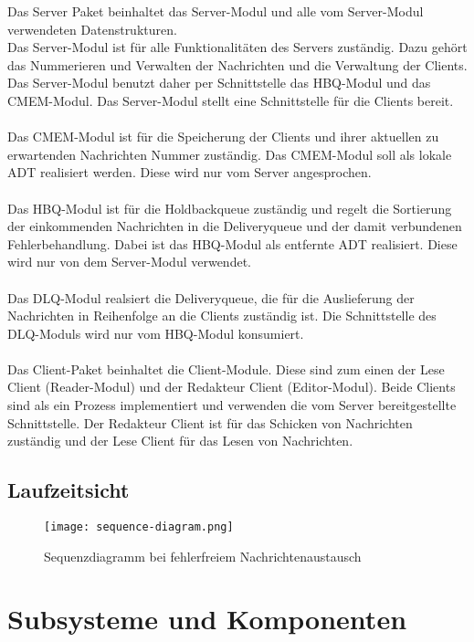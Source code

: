 \documentclass{article}
\begin{document}
Das Server Paket beinhaltet das Server-Modul und alle vom Server-Modul verwendeten Datenstrukturen.\\
Das Server-Modul ist für alle Funktionalitäten des Servers zuständig. Dazu gehört das Nummerieren und Verwalten der Nachrichten und die Verwaltung der Clients.\\
Das Server-Modul benutzt daher per Schnittstelle das HBQ-Modul und das CMEM-Modul. Das Server-Modul stellt eine Schnittstelle für die Clients bereit.\\
\\
Das CMEM-Modul ist für die Speicherung der Clients und ihrer aktuellen zu erwartenden Nachrichten Nummer zuständig. Das CMEM-Modul soll als lokale ADT realisiert werden. Diese wird nur vom Server angesprochen.\\
\\
Das HBQ-Modul ist für die Holdbackqueue zuständig und regelt die Sortierung der einkommenden Nachrichten in die Deliveryqueue und der damit verbundenen Fehlerbehandlung. Dabei ist das HBQ-Modul als entfernte ADT realisiert. Diese wird nur von dem Server-Modul verwendet.\\
\\
Das DLQ-Modul realsiert die Deliveryqueue, die für die Auslieferung der Nachrichten in Reihenfolge an die Clients zuständig ist. Die Schnittstelle des DLQ-Moduls wird nur vom HBQ-Modul konsumiert.\\
\\
Das Client-Paket beinhaltet die Client-Module. Diese sind zum einen der Lese Client (Reader-Modul) und der Redakteur Client (Editor-Modul). Beide Clients sind als ein Prozess implementiert und verwenden die vom Server bereitgestellte Schnittstelle. Der Redakteur Client ist für das Schicken von Nachrichten zuständig und der Lese Client für das Lesen von Nachrichten.

\subsection{Laufzeitsicht}
\begin{figure}[H]
\centering
\texttt{[image: sequence-diagram.png]}
\caption[seq-dia]{Sequenzdiagramm bei fehlerfreiem Nachrichtenaustausch}
\label{fig:sequence-diagram}
\end{figure}

\newpage

\section{Subsysteme und Komponenten}
\end{document}
